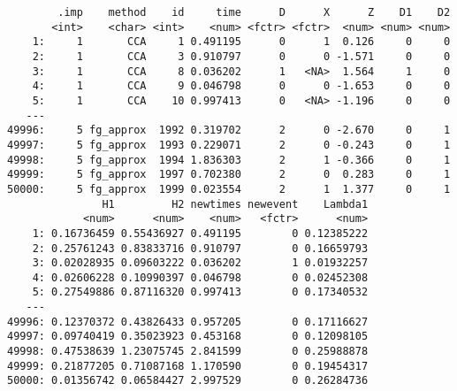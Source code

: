 \documentclass[
  12pt,
  a4paper,
]{article}
\newenvironment{Shaded}{\begin{snugshade}}{\end{snugshade}}
\newcommand{\AttributeTok}[1]{\textcolor[rgb]{0.40,0.45,0.13}{#1}}
\newcommand{\CommentTok}[1]{\textcolor[rgb]{0.37,0.37,0.37}{#1}}
\newcommand{\ControlFlowTok}[1]{\textcolor[rgb]{0.00,0.23,0.31}{\textbf{#1}}}
\newcommand{\FunctionTok}[1]{\textcolor[rgb]{0.28,0.35,0.67}{#1}}
\newcommand{\NormalTok}[1]{\textcolor[rgb]{0.00,0.23,0.31}{#1}}
\newcommand{\OtherTok}[1]{\textcolor[rgb]{0.00,0.23,0.31}{#1}}
\newcommand{\SpecialCharTok}[1]{\textcolor[rgb]{0.37,0.37,0.37}{#1}}
\newcommand{\StringTok}[1]{\textcolor[rgb]{0.13,0.47,0.30}{#1}}
\begin{document}
\begin{verbatim}
        .imp    method    id     time      D      X      Z    D1    D2
       <int>    <char> <int>    <num> <fctr> <fctr>  <num> <num> <num>
    1:     1       CCA     1 0.491195      0      1  0.126     0     0
    2:     1       CCA     3 0.910797      0      0 -1.571     0     0
    3:     1       CCA     8 0.036202      1   <NA>  1.564     1     0
    4:     1       CCA     9 0.046798      0      0 -1.653     0     0
    5:     1       CCA    10 0.997413      0   <NA> -1.196     0     0
   ---                                                                
49996:     5 fg_approx  1992 0.319702      2      0 -2.670     0     1
49997:     5 fg_approx  1993 0.229071      2      0 -0.243     0     1
49998:     5 fg_approx  1994 1.836303      2      1 -0.366     0     1
49999:     5 fg_approx  1997 0.702380      2      0  0.283     0     1
50000:     5 fg_approx  1999 0.023554      2      1  1.377     0     1
               H1         H2 newtimes newevent    Lambda1
            <num>      <num>    <num>   <fctr>      <num>
    1: 0.16736459 0.55436927 0.491195        0 0.12385222
    2: 0.25761243 0.83833716 0.910797        0 0.16659793
    3: 0.02028935 0.09603222 0.036202        1 0.01932257
    4: 0.02606228 0.10990397 0.046798        0 0.02452308
    5: 0.27549886 0.87116320 0.997413        0 0.17340532
   ---                                                   
49996: 0.12370372 0.43826433 0.957205        0 0.17116627
49997: 0.09740419 0.35023923 0.453168        0 0.12098105
49998: 0.47538639 1.23075745 2.841599        0 0.25988878
49999: 0.21877205 0.71087168 1.170590        0 0.19454317
50000: 0.01356742 0.06584427 2.997529        0 0.26284736
\end{verbatim}

\begin{Shaded}
\end{Shaded}
\end{document}
